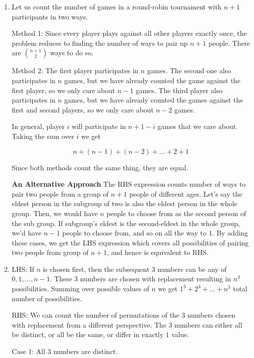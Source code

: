 \begin{enumerate}[label=(\alph*)]
\item   Let us count the number of games in a round-robin tournament with $n+1$ 
participants in two ways.
  
  Method 1: Since every player plays against all other players exactly once, 
  the problem reduces to finding the number of ways to pair up $n+1$ people. 
  There are ${n+1 \choose 2}$ ways to do so.
  
  Method 2: The first player participates in $n$ games. The second one also 
  participates in $n$ games, but we have already counted the game against the 
  first player, so we only care about $n-1$ games. The third player also 
  participates in $n$ games, but we have already counted the games against 
  the first and second players, so we only care about $n-2$ games. 
  
  In general, player $i$ will participate in $n+1-i$ games that we care about. 
  Taking the sum over $i$ we get
  
  $$n + (n-1) + (n-2) + \dots + 2 + 1$$
  
  Since both methods count the same thing, they are equal.

  \textbf{An Alternative Approach}
  The RHS expression counts number of ways to pair two people from a group of 
  $n+1$ people of different ages. Let's say the eldest person in the 
  subgroup of two is also the eldest person in the whole group. Then, we would
  have $n$ people to choose from as the second person of the sub group. If 
  subgroup's eldest is the second-eldest in the whole group, we'd have $n-1$ 
  people to choose from, and so on all the way to $1$. By adding these cases,
  we get the LHS expression which covers all possibilities of pairing two people
  from group of $n+1$, and hence is equivalent to RHS.

\item LHS: If $n$ is chosen first, then the subsequent $3$ numbers can be any 
of $0, 1, \dots, n-1$. These $3$ numbers are chosen with replacement resulting 
in $n^{3}$ possibilities. Summing over possible values of 
$n$ we get $1^{3} + 2^{3} + \dots + n^{3}$ total number of possibilities.
  
  RHS: We can count the number of permutations of the $3$ numbers chosen with 
  replacement from a different perspective. The $3$ numbers can either all be 
  distinct, or all be the same, or differ in exactly $1$ value.
  
  Case 1: All $3$ numbers are distinct.
  

\end{enumerate}
